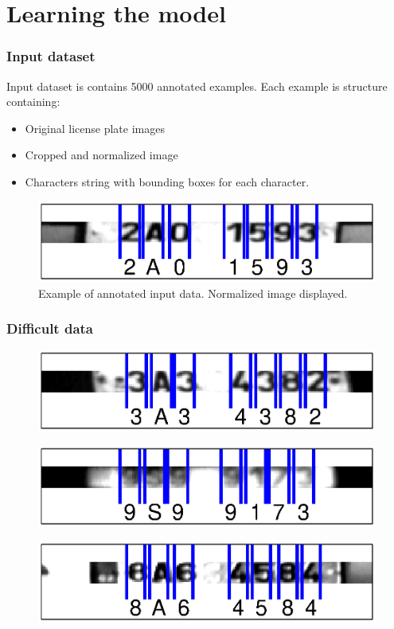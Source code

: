 \documentclass{beamer}
\begin{document}
\section{Learning the model}

\begin{frame}
  \frametitle{Input dataset}
  Input dataset is contains 5000 annotated examples. Each example is structure containing:
\begin{itemize}
  \item Original license plate images
  \item Cropped and normalized image
  \item Characters string with bounding boxes for each character.
\end{itemize}

\begin{figure}
\includegraphics[width=\linewidth]{pics/input_example.eps}
\caption{Example of annotated input data. Normalized image displayed.}
\label{fig:distribution}
\end{figure}

\end{frame}

\begin{frame}
  \frametitle{Difficult data}
\begin{figure}
\includegraphics[width=0.8\linewidth]{pics/bad1.eps}
\end{figure}

\begin{figure}
\includegraphics[width=0.8\linewidth]{pics/bad2.eps}
\end{figure}

\begin{figure}
\includegraphics[width=0.8\linewidth]{pics/bad3.eps}
\end{figure}

\end{frame}
\end{document}

